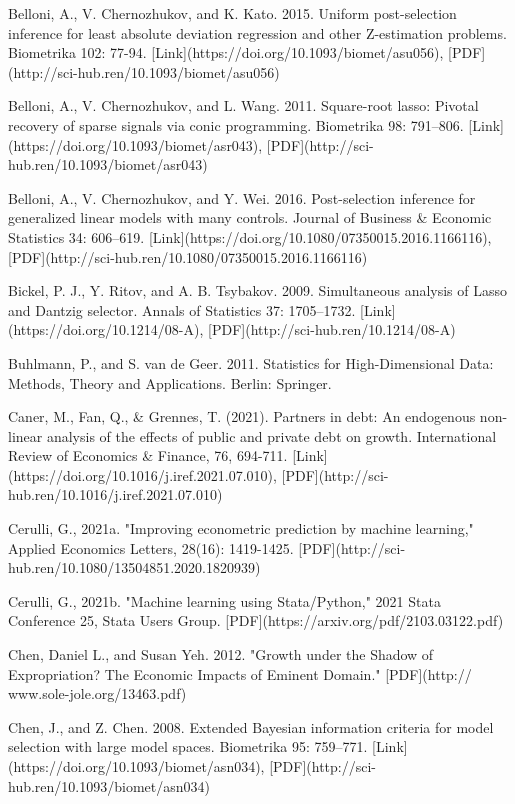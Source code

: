 {Belloni, A., V. Chernozhukov, and K. Kato. 2015. Uniform post-selection inference for least absolute deviation regression and other Z-estimation problems. Biometrika 102: 77-94. [Link](https://doi.org/10.1093/biomet/asu056), [PDF](http://sci-hub.ren/10.1093/biomet/asu056)

Belloni, A., V. Chernozhukov, and L. Wang. 2011. Square-root lasso: Pivotal recovery of sparse signals via conic programming. Biometrika 98: 791–806. [Link](https://doi.org/10.1093/biomet/asr043), [PDF](http://sci-hub.ren/10.1093/biomet/asr043)

Belloni, A., V. Chernozhukov, and Y. Wei. 2016. Post-selection inference for generalized linear models with many controls. Journal of Business \& Economic Statistics 34: 606–619.  [Link](https://doi.org/10.1080/07350015.2016.1166116), [PDF](http://sci-hub.ren/10.1080/07350015.2016.1166116)


Bickel, P. J., Y. Ritov, and A. B. Tsybakov. 2009. Simultaneous analysis of Lasso and Dantzig selector. Annals of
Statistics 37: 1705–1732. [Link](https://doi.org/10.1214/08-A), [PDF](http://sci-hub.ren/10.1214/08-A)

Buhlmann, P., and S. van de Geer. 2011. Statistics for High-Dimensional Data: Methods, Theory and Applications.
Berlin: Springer.

Caner, M., Fan, Q., \& Grennes, T. (2021). Partners in debt: An endogenous non-linear analysis of the effects of public and private debt on growth. International Review of Economics \& Finance, 76, 694-711. [Link](https://doi.org/10.1016/j.iref.2021.07.010), [PDF](http://sci-hub.ren/10.1016/j.iref.2021.07.010)

Cerulli, G., 2021a. "Improving econometric prediction by machine learning," Applied Economics Letters, 28(16): 1419-1425. [PDF](http://sci-hub.ren/10.1080/13504851.2020.1820939)

Cerulli, G., 2021b. "Machine learning using Stata/Python," 2021 Stata Conference 25, Stata Users Group. [PDF](https://arxiv.org/pdf/2103.03122.pdf)

Chen, Daniel L., and Susan Yeh. 2012. "Growth under the Shadow of Expropriation? The Economic Impacts of Eminent Domain." [PDF](http:// www.sole-jole.org/13463.pdf)

Chen, J., and Z. Chen. 2008. Extended Bayesian information criteria for model selection
with large model spaces. Biometrika 95: 759–771. [Link](https://doi.org/10.1093/biomet/asn034), [PDF](http://sci-hub.ren/10.1093/biomet/asn034)

}
